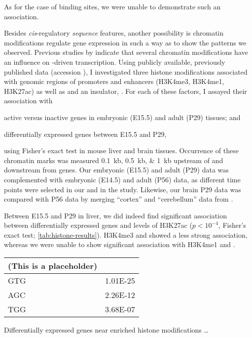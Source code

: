 As for the case of \tf binding sites, we were
unable to demonstrate such an association.

Besides \emph{cis}-regulatory \emph{sequence} features, another possibility is
chromatin modifications regulate \trna gene expression in such a way as to show
the patterns we observed. Previous studies by \citet{Barski:2010,Oler:2010}
indicate that several chromatin modifications have an influence on -driven
transcription. Using publicly available, previously published data
\citep{Shen:2012} (\geo accession ), I investigated three
histone modifications associated with genomic regions of promoters and enhancers
(H3K4me3, H3K4me1, H3K27ac) as well as  and an insulator, \ctcf. For each
of these factors, I assayed their association with

\begin{shortenumerate}
    \item active versus inactive \trna genes in embryonic (E15.5) and adult
        (P29) tissues; and
    \item differentially expressed \trna genes between E15.5 and P29,
\end{shortenumerate}

using Fisher’s exact test in mouse liver and brain tissues. Occurrence of these
chromatin marks was measured \SIlist{0.1;0.5;1}{kb} upstream of and downstream
from \trna genes. Our embryonic (E15.5) and adult (P29)  data was
complemented with embryonic (E14.5) and adult (P56) \chipseq data, as different
time points were selected in our and in the \citet{Shen:2012} study. Likewise,
our brain P29 data was compared with P56 data by merging “cortex” and
“cerebellum” \chipseq data from \citet{Shen:2012}.

Between E15.5 and P29 in liver, we did indeed find significant association
between differentially expressed \trna genes and levels of H3K27ac (\(p <
10^{-4}\), Fisher’s exact test; \cref{tab:histone-results}). H3K4me3 and 
showed a less strong association, whereas we were unable to show significant
association with H3K4me1 and \ctcf.

\begin{table}[h!]
    \centering
    \begin{tabular}{@{}lr@{}}
        \toprule
        \multicolumn{1}{c}{\textbf{(This is a placeholder)}} \\
        \midrule
        GTG &   1.01E-25 \\
        AGC &   2.26E-12 \\
        TGG &   3.68E-07 \\
        \bottomrule
    \end{tabular}

    {Differentially expressed \trna genes near enriched histone modifications}
    {…}
\end{table}

